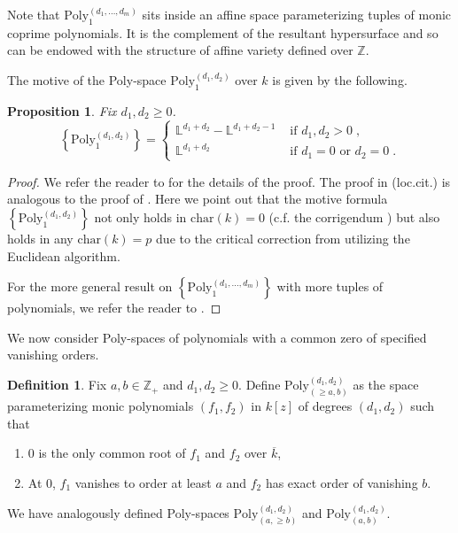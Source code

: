 \documentclass[a4paper,12pt]{amsart}
\newtheorem{prop}[thm]{Proposition}
\theoremstyle{definition}
\newtheorem{defn}[thm]{Definition}
\newcommand{\bZ}{\mathbb{Z}}
\newcommand{\Lb}{\mathbb{L}}
\begin{document}
	Note that $\mathrm{Poly}_1^{(d_1,\dotsc,d_m)}$ sits inside an affine space parameterizing tuples of monic coprime polynomials. It is the complement of the resultant hypersurface and so can be endowed with the structure of affine variety defined over $\bZ$. 
	
	
	\medskip
	
	The motive of the Poly-space $\mathrm{Poly}_1^{(d_1, d_2)}$ over $k$ is given by the following.
	
	\begin{prop}
		\label{prop:poly_m}
		Fix $d_1,d_2 \ge 0$. 
		\[ \left\{\mathrm{Poly}_1^{(d_1, d_2)}\right\}=
		\begin{cases}
			\Lb^{d_1 + d_2}-\Lb^{d_1 + d_2 - 1} & \text{ if } d_1,d_2 >0\;, \\
			\Lb^{d_1 + d_2} & \text{ if } d_1=0 \text{ or } d_2=0\;.
		\end{cases}
		\]
	\end{prop}
	
	\begin{proof}
		We refer the reader to \cite[Prop. 18]{HP} for the details of the proof. The proof in (loc.cit.) is analogous to the proof of \cite[Thm. 1.2]{FW}. 
		Here we point out that the motive formula $\left\{\mathrm{Poly}_1^{(d_1, d_2)}\right\}$ not only holds in $\mathrm{char}(k)=0$ (c.f. the corrigendum \cite{FW2}) but also holds in any $\mathrm{char}(k)=p$ due to the critical correction from \cite[Prop. 3.1]{PS} utilizing the Euclidean algorithm. 
		
		For the more general result on $\left\{\mathrm{Poly}_1^{(d_1,\dotsc,d_m)}\right\}$ with more tuples of polynomials, we refer the reader to \cite[Prop. 4.4]{HP2}.
	\end{proof}
	
	We now consider Poly-spaces of polynomials with a common zero of specified vanishing orders.
	
	\begin{defn}\label{def:polygeqab}
		Fix $a,b \in \bZ_{+}$ and $d_1,d_2 \ge 0$. Define $\mathrm{Poly}_{(\ge a,b)}^{(d_1, d_2)}$ as the space parameterizing monic polynomials $(f_1,f_2)$ in $k[z]$ of degrees $(d_1, d_2)$ such that
		\begin{enumerate}
			\item $0$ is the only common root of $f_1$ and $f_2$ over $\overline{k}$,
			\item At $0$, $f_1$ vanishes to order at least $a$ and $f_2$ has exact order of vanishing $b$.
		\end{enumerate}
		We have analogously defined Poly-spaces $\mathrm{Poly}_{(a,\geq b)}^{(d_1, d_2)}$ and $\mathrm{Poly}_{(a,b)}^{(d_1, d_2)}$.
	\end{defn}
	
\end{document}
